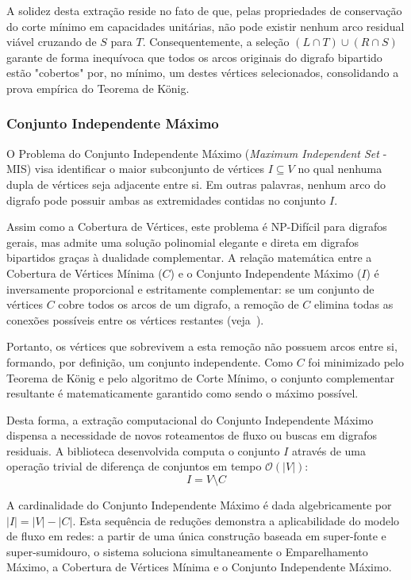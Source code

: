 \documentclass[12pt,a4paper]{article}
\begin{document}
A solidez desta extração reside no fato de que, pelas propriedades de conservação do corte mínimo em capacidades unitárias, não pode existir nenhum arco residual viável cruzando de $S$ para $T$. Consequentemente, a seleção $(L \cap T) \cup (R \cap S)$ garante de forma inequívoca que todos os arcos originais do digrafo bipartido estão "cobertos" por, no mínimo, um destes vértices selecionados, consolidando a prova empírica do Teorema de König.

\subsubsection{Conjunto Independente Máximo}

O Problema do Conjunto Independente Máximo (\textit{Maximum Independent Set} - MIS) visa identificar o maior subconjunto de vértices $I \subseteq V$ no qual nenhuma dupla de vértices seja adjacente entre si. Em outras palavras, nenhum arco do digrafo pode possuir ambas as extremidades contidas no conjunto $I$.

Assim como a Cobertura de Vértices, este problema é NP-Difícil para digrafos gerais, mas admite uma solução polinomial elegante e direta em digrafos bipartidos graças à dualidade complementar. A relação matemática entre a Cobertura de Vértices Mínima ($C$) e o Conjunto Independente Máximo ($I$) é inversamente proporcional e estritamente complementar: se um conjunto de vértices $C$ cobre todos os arcos de um digrafo, a remoção de $C$ elimina todas as conexões possíveis entre os vértices restantes (veja~\cite{cook1998combinatorial}).

Portanto, os vértices que sobrevivem a esta remoção não possuem arcos entre si, formando, por definição, um conjunto independente. Como $C$ foi minimizado pelo Teorema de König e pelo algoritmo de Corte Mínimo, o conjunto complementar resultante é matematicamente garantido como sendo o máximo possível.

Desta forma, a extração computacional do Conjunto Independente Máximo dispensa a necessidade de novos roteamentos de fluxo ou buscas em digrafos residuais. A biblioteca desenvolvida computa o conjunto $I$ através de uma operação trivial de diferença de conjuntos em tempo $\mathcal{O}(|V|)$:
\begin{equation}
    I = V \setminus C
\end{equation}

A cardinalidade do Conjunto Independente Máximo é dada algebricamente por $|I| = |V| - |C|$. Esta sequência de reduções demonstra a aplicabilidade do modelo de fluxo em redes: a partir de uma única construção baseada em super-fonte e super-sumidouro, o sistema soluciona simultaneamente o Emparelhamento Máximo, a Cobertura de Vértices Mínima e o Conjunto Independente Máximo.
\end{document}
